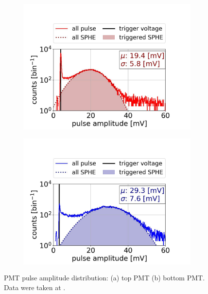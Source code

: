 \begin{figure}[!h]
	\centering
	\begin{subfigure}[b]{\halfwidth}
		\centering
		\includegraphics[width=\textwidth,clip,trim={0 0 0 0},angle=0,origin=c]{Figures/GasTest/DatasetQuality/topPMTTriggerEfficiency65831.jpg}
		\caption{}
		\label{fig:PMTTriggerEff top}
	\end{subfigure}
	\begin{subfigure}[b]{\halfwidth}
		\centering
		\includegraphics[width=\textwidth,clip,trim={0 0 0 0}]{Figures/GasTest/DatasetQuality/botPMTTriggerEfficiency65831.jpg}
		\caption{}
		\label{fig:PMTTriggerEff bottom}
	\end{subfigure}
	\caption[PMT pulse amplitude distribution]{PMT pulse amplitude distribution: (a) top PMT (b) bottom PMT. Data were taken at .}
	\label{fig:PMTTriggerEff}
\end{figure}


